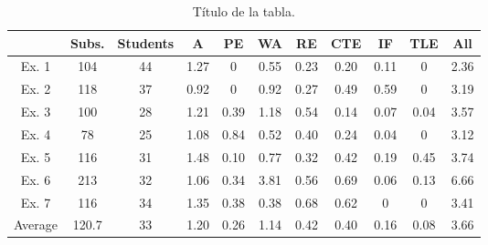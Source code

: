 \documentclass[12pt,twoside,titlepage]{report}
\begin{document}
\begin{table}
  \centering
  \caption{Título de la tabla.}
  \label{tab:una_tabla}

\begin{footnotesize}
\renewcommand{\arraystretch}{1.5} %
\begin{tabular}{ccccccccccc}
  \hline
   & Subs. & Students & A & PE & WA & RE & CTE & IF & TLE & All\\
  \hline
Ex. 1 & 104 & 44 & 1.27    &   0       &   0.55    &   0.23    &   0.20    &   0.11    &   0     & 2.36  \\
Ex. 2 & 118 & 37 & 0.92    &   0       &   0.92    &   0.27    &   0.49    &   0.59    &   0     & 3.19  \\
Ex. 3 & 100 & 28 & 1.21    &   0.39    &   1.18    &   0.54    &   0.14    &   0.07    &   0.04  & 3.57  \\
Ex. 4 & 78  & 25 & 1.08    &   0.84    &   0.52    &   0.40    &   0.24    &   0.04    &   0     & 3.12  \\
Ex. 5 & 116 & 31 & 1.48    &   0.10    &   0.77    &   0.32    &   0.42    &   0.19    &   0.45  & 3.74  \\
Ex. 6 & 213 & 32 & 1.06    &   0.34    &   3.81    &   0.56    &   0.69    &   0.06    &   0.13  & 6.66  \\
Ex. 7 & 116 & 34 & 1.35    &   0.38    &   0.38    &   0.68    &   0.62    &   0       &   0     & 3.41  \\
  \hline
Average & 120.7 & 33 & 1.20 &  0.26 &  1.14 &  0.42 &  0.40 &  0.16 &  0.08 & 3.66 \\
  \hline
 \end{tabular}
\end{footnotesize}

\end{table}
\end{document}
